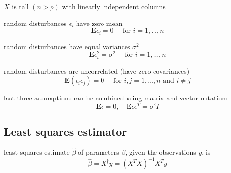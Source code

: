 \begin{proposition}
    $ X $ is tall $ (n>p) $ with linearly independent columns
\end{proposition}

\begin{proposition}
    random disturbances $ \epsilon_{i} $ have zero mean
$$
\mathbf{E} \epsilon_{i}=0 \quad \text { for } i=1, \ldots, n
$$
\end{proposition}

\begin{proposition}
    random disturbances have equal variances $ \sigma^{2} $
$$
\mathbf{E} \epsilon_{i}^{2}=\sigma^{2} \quad \text { for } i=1, \ldots, n
$$
\end{proposition}

\begin{proposition}
    random disturbances are uncorrelated (have zero covariances)
$$
\mathbf{E}\left(\epsilon_{i} \epsilon_{j}\right)=0 \quad \text { for } i, j=1, \ldots, n \text { and } i \neq j
$$
\end{proposition}

\begin{theorem}
    last three assumptions can be combined using matrix and vector notation:
$$
\mathbf{E} \epsilon=0, \quad \mathbf{E} \epsilon \epsilon^{T}=\sigma^{2} I
$$
\end{theorem}


\subsection{Least squares estimator}

\begin{theorem}
    least squares estimate $ \hat{\beta} $ of parameters $ \beta $, given the observations $ y $, is
$$
\hat{\beta}=X^{\dagger} y=\left(X^{T} X\right)^{-1} X^{T} y
$$
\end{theorem}

